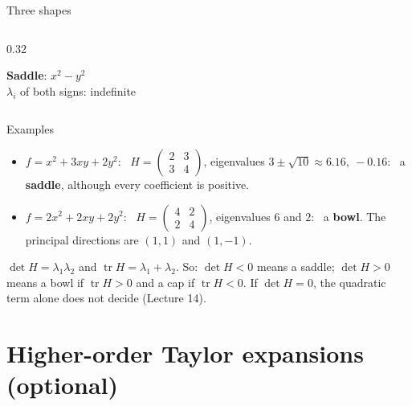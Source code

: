 \documentclass[10pt]{wosm-slides}
\begin{document}
\begin{frame}{Three shapes}
\begin{columns}[T]
\begin{column}{0.32\textwidth}
      \par\small \textbf{Saddle}: $x^2 - y^2$ \\
      $\lambda_i$ of both signs: indefinite
    \end{column}
  \end{columns}
\end{frame}

\begin{frame}{Examples}
  \begin{itemize}
    \item $f = x^2 + 3xy + 2y^2$: \ $H = \begin{pmatrix} 2 & 3 \\ 3 & 4 \end{pmatrix}$, eigenvalues
      $3 \pm \sqrt{10} \approx 6.16, \ -0.16$: \ a \textbf{saddle}, although every coefficient is positive.
    \item $f = 2x^2 + 2xy + 2y^2$: \ $H = \begin{pmatrix} 4 & 2 \\ 2 & 4 \end{pmatrix}$, eigenvalues $6$
      and $2$: \ a \textbf{bowl}. The principal directions are $(1, 1)$ and $(1, -1)$.
  \end{itemize}
  \pause
  \begin{remark}
    $\det H = \lambda_1 \lambda_2$ and $\operatorname{tr} H = \lambda_1 + \lambda_2$. So: $\det H < 0$ means a
    saddle; $\det H > 0$ means a bowl if $\operatorname{tr} H > 0$ and a cap if $\operatorname{tr} H < 0$.
    If $\det H = 0$, the quadratic term alone does not decide (Lecture 14).
  \end{remark}
\end{frame}

\section{Higher-order Taylor expansions (optional)}
\end{document}
